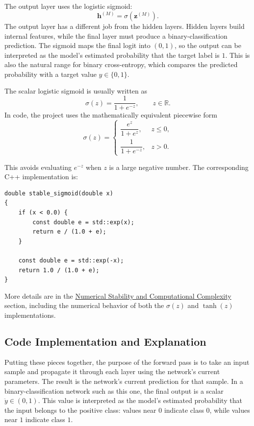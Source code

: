 \documentclass{article}
\begin{document}
The output layer uses the logistic sigmoid:
\[
  \mathbf{h}^{(M)} = \sigma\!\left(\mathbf{z}^{(M)}\right).
\]
The output layer has a different job from the hidden layers. Hidden
layers build internal features, while the final layer must produce a
binary-classification prediction. The sigmoid maps the final logit into
\((0,1)\), so the output can be interpreted as the model's estimated
probability that the target label is \(1\). This is also the natural
range for binary cross-entropy, which compares the predicted
probability with a target value \(y \in \{0,1\}\).

The scalar logistic sigmoid is usually written as
\[
  \sigma(z) = \frac{1}{1 + e^{-z}},
  \qquad z \in \mathbb{R}.
\]
In code, the project uses the mathematically equivalent piecewise form
\[
  \sigma(z)
  =
  \begin{cases}
    \dfrac{e^z}{1 + e^z}, & z \leq 0,\\[6pt]
    \dfrac{1}{1 + e^{-z}}, & z > 0.
  \end{cases}
\]

This avoids evaluating \(e^{-z}\) when \(z\) is a large negative
number. The corresponding C++ implementation is:

\begin{verbatim}
double stable_sigmoid(double x)
{
    if (x < 0.0) {
        const double e = std::exp(x);
        return e / (1.0 + e);
    }

    const double e = std::exp(-x);
    return 1.0 / (1.0 + e);
}
\end{verbatim}

More details are in the
\hyperref[sec:numerical-stability]{Numerical Stability and Computational
Complexity} section, including the numerical behavior of both the
\(\sigma(z)\) and \(\tanh(z)\) implementations.

\subsection{Code Implementation and Explanation}

Putting these pieces together, the purpose of the forward pass is to
take an input sample and propagate it through each layer using the
network's current parameters. The result is the network's current
prediction for that sample. In a binary-classification network such as
this one, the final output is a scalar
\(\ddot{y} \in (0,1)\). This value is interpreted as the model's
estimated probability that the input belongs to the positive class:
values near \(0\) indicate class \(0\), while values near \(1\)
indicate class \(1\).
\end{document}
